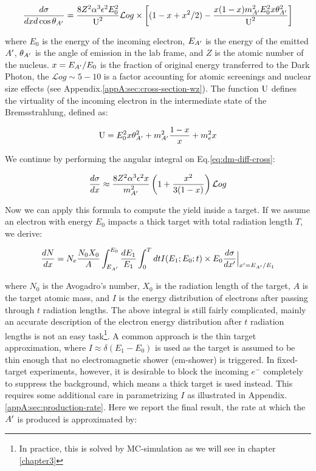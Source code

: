 \begin{equation}
  \label{eq:dm-diff-cross}
  \frac{d\sigma}{dxd\cos{\theta_{A'}}} = \frac{8 Z^2 \alpha^3 \epsilon^2 E^2_0}{\textrm{U}^2} \mathcal{L}og \times \left[ (1 - x + x^2/2) - \frac{x(1-x)m^2_{A'}E^2_0 x \theta^2_{A'}}{\textrm{U}^2} \right]
\end{equation}

where $E_0$ is the energy of the incoming electron, $E_{A'}$ is the energy of the emitted $A'$, $\theta_{A'}$ is the angle of emission in the lab frame, and $Z$ is the atomic number of the nucleus. $x=E_{A'}/E_0$ is the fraction of original energy transferred to the Dark Photon, the $\mathcal{L}og \sim 5 - 10$ is a factor accounting for atomic screenings and nuclear size effects (see Appendix.\ref{appA:sec:cross-section-wz}). The function $\rm{U}$ defines the virtuality of the incoming electron in the intermediate state of the Bremsstrahlung, defined as:

\begin{equation}
  \label{eq:u-func}
  \textrm{U} = E^2_0 x \theta^2_{A'} + m^2_{A'} \frac{1 - x}{x} + m^2_e x
\end{equation}

We continue by performing the angular integral on Eq.\ref{eq:dm-diff-cross}:

\begin{equation}
  \label{eq:dm-diff-cross-int}
  \frac{d\sigma}{dx} \approx \frac{8 Z^2 \alpha^3 \epsilon^2 x}{m^2_{A'}} \left( 1 + \frac{x^2}{3(1-x)} \right) \mathcal{L}og 
\end{equation}

Now we can apply this formula to compute the yield inside a target. If we assume an electron with energy $E_0$ impacts a thick target with total radiation length $T$, we derive:

\begin{equation}
  \label{eq:dm-general-yield}
  \frac{dN}{dx} = N_e \frac{N_0 X_0}{A} \int_{E_{A'}}^{E_0} \frac{dE_1}{E_1} \int_0^T dt I(E_1;E_0;t) \times E_0 \frac{d\sigma}{dx'}\Big|_{x' = E_{A'}/E_1}
\end{equation}

where $N_0$ is the Avogadro's number, $X_0$ is the radiation length of the target, $A$ is the target atomic mass, and $I$ is the energy distribution of electrons after passing through $t$ radiation lengths. The above integral is still fairly complicated, mainly an accurate description of the electron energy distribution after $t$ radiation lengths is not an easy task\footnote{In practice, this is solved by MC-simulation as we will see in chapter \ref{chapter3}}. A common approach is the thin target approximation, where $I \approx \delta (E_1 - E_0)$ is used as the target is assumed to be thin enough that no electromagnetic shower (em-shower) is triggered. In fixed-target experiments, however, it is desirable to block the incoming $e^-$ completely to suppress the background, which means a thick target is used instead. This requires some additional care in parametrizing $I$ as illustrated in Appendix.\ref{appA:sec:production-rate}. Here we report the final result, the rate at which the $A'$ is produced is approximated by:

